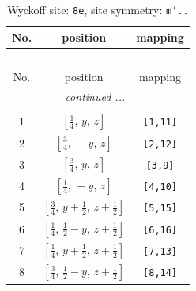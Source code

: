 \documentclass[fleqn,8pt]{jsarticle}
\begin{document}
\begin{longtable}{ccc}
\caption{Wyckoff site: {\tt 8e}, site symmetry: {\tt m'..}}
 \\
 \hline \hline
No. & position & mapping \\ \hline \endfirsthead

\multicolumn{2}{l}{\tablename\ \thetable{}} \\
 \hline \hline
No. & position & mapping \\ \hline \endhead

 \hline \hline
\multicolumn{2}{r}{\footnotesize\it continued ...} \\ \endfoot

 \hline \hline
\multicolumn{2}{r}{} \\ \endlastfoot

1 & $\left[ \frac{1}{4},\, y,\, z \right]$ & {\tt [1,11]} \\ \hline
2 & $\left[ \frac{3}{4},\, - y,\, z \right]$ & {\tt [2,12]} \\ \hline
3 & $\left[ \frac{3}{4},\, y,\, z \right]$ & {\tt [3,9]} \\ \hline
4 & $\left[ \frac{1}{4},\, - y,\, z \right]$ & {\tt [4,10]} \\ \hline
5 & $\left[ \frac{3}{4},\, y + \frac{1}{2},\, z + \frac{1}{2} \right]$ & {\tt [5,15]} \\ \hline
6 & $\left[ \frac{1}{4},\, \frac{1}{2} - y,\, z + \frac{1}{2} \right]$ & {\tt [6,16]} \\ \hline
7 & $\left[ \frac{1}{4},\, y + \frac{1}{2},\, z + \frac{1}{2} \right]$ & {\tt [7,13]} \\ \hline
8 & $\left[ \frac{3}{4},\, \frac{1}{2} - y,\, z + \frac{1}{2} \right]$ & {\tt [8,14]} \\
\end{longtable}
\renewcommand{\arraystretch}{1.2}
\end{document}
